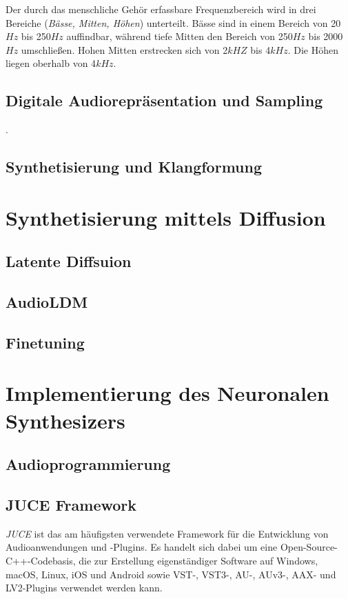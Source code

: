 \documentclass[
  a4paper,  %
  twoside,  %
  bibliography=totoc,
  headsepline,
  cleardoublepage=empty,
  parskip=half,
  draft=false
]{scrbook}
\begin{document}
Der durch das menschliche Gehör erfassbare Frequenzbereich wird in drei Bereiche (\emph{Bässe, Mitten, Höhen}) unterteilt. Bässe sind in einem Bereich von 20$Hz$ bis 250$Hz$ auffindbar, während tiefe Mitten den Bereich von 250$Hz$ bis 2000$Hz$ umschließen. Hohen Mitten erstrecken sich von 2$kHZ$ bis 4$kHz$. Die Höhen liegen oberhalb von 4$kHz$. \cite{raffaseder_audiodesign_2010}
\subsection{Digitale Audiorepräsentation und Sampling}. 
\subsection{Synthetisierung und Klangformung}


\section{Synthetisierung mittels Diffusion}
\subsection{Latente Diffsuion}
\subsection{AudioLDM}
\subsection{Finetuning}
\section{Implementierung des Neuronalen Synthesizers}
\subsection{Audioprogrammierung}
\subsection{JUCE Framework}
\glqq\emph{JUCE} ist das am häufigsten verwendete Framework für die Entwicklung von Audioanwendungen und -Plugins. Es handelt sich dabei um eine Open-Source-C++-Codebasis, die zur Erstellung eigenständiger Software auf Windows, macOS, Linux, iOS und Android sowie VST-, VST3-, AU-, AUv3-, AAX- und LV2-Plugins verwendet werden kann.\grqq \cite{noauthor_juce_nodate}
\end{document}
